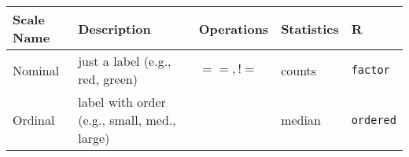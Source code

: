 \documentclass[
  notitlepage]{book}
\begin{document}
\begin{longtable}[]{@{}lllll@{}}
\toprule
\begin{minipage}[b]{0.19\columnwidth}\raggedright
Scale Name\strut
\end{minipage} & \begin{minipage}[b]{0.23\columnwidth}\raggedright
Description\strut
\end{minipage} & \begin{minipage}[b]{0.17\columnwidth}\raggedright
Operations\strut
\end{minipage} & \begin{minipage}[b]{0.13\columnwidth}\raggedright
Statistics\strut
\end{minipage} & \begin{minipage}[b]{0.13\columnwidth}\raggedright
R\strut
\end{minipage}\tabularnewline
\midrule
\endhead
\begin{minipage}[t]{0.19\columnwidth}\raggedright
Nominal\strut
\end{minipage} & \begin{minipage}[t]{0.23\columnwidth}\raggedright
just a label (e.g., red, green)\strut
\end{minipage} & \begin{minipage}[t]{0.17\columnwidth}\raggedright
\(==, !=\)\strut
\end{minipage} & \begin{minipage}[t]{0.13\columnwidth}\raggedright
counts\strut
\end{minipage} & \begin{minipage}[t]{0.13\columnwidth}\raggedright
\texttt{factor}\strut
\end{minipage}\tabularnewline
\begin{minipage}[t]{0.19\columnwidth}\raggedright
Ordinal\strut
\end{minipage} & \begin{minipage}[t]{0.23\columnwidth}\raggedright
label with order (e.g., small, med., large)\strut
\end{minipage} & \begin{minipage}[t]{0.17\columnwidth}\raggedright
\(<, >\)\strut
\end{minipage} & \begin{minipage}[t]{0.13\columnwidth}\raggedright
median\strut
\end{minipage} & \begin{minipage}[t]{0.13\columnwidth}\raggedright
\texttt{ordered}\strut
\end{minipage}\tabularnewline

\end{longtable}
\end{document}
